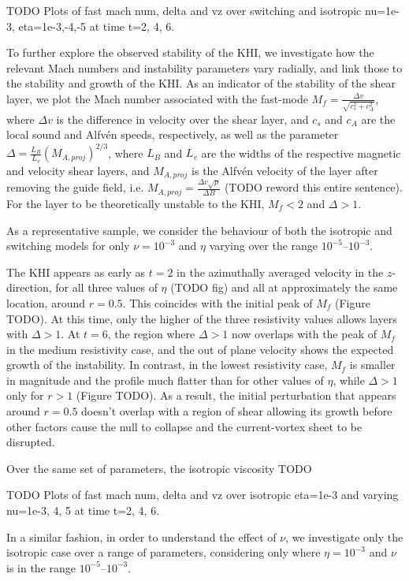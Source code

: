 TODO Plots of fast mach num, delta and vz over switching and isotropic nu=1e-3, eta=1e-3,-4,-5 at time t=2, 4, 6.

To further explore the observed stability of the KHI, we investigate how the relevant Mach numbers and instability parameters vary radially, and link those to the stability and growth of the KHI. As an indicator of the stability of the shear layer, we plot the Mach number associated with the fast-mode $M_f = \frac{\Delta v}{\sqrt{c_s^2 + c_A^2}}$, where $\Delta v$ is the difference in velocity over the shear layer, and $c_s$ and $c_A$ are the local sound and Alfv\'en speeds, respectively, as well as the parameter $\Delta = \frac{L_B}{L_v}(M_{A, proj})^{2/3}$, where $L_B$ and $L_v$ are the widths of the respective magnetic and velocity shear layers, and $M_{A, proj}$ is the Alfv\'en velocity of the layer after removing the guide field, i.e. $M_{A, proj} = \frac{\Delta v \sqrt{\rho}}{\Delta B}$ (TODO reword this entire sentence). For the layer to be theoretically unstable to the KHI, $M_f < 2$ and $\Delta > 1$.

As a representative sample, we consider the behaviour of both the isotropic and switching models for only $\nu=10^{-3}$ and $\eta$ varying over the range $10^{-5}$--$10^{-3}$.

The KHI appears as early as $t=2$ in the azimuthally averaged velocity in the $z$-direction, for all three values of $\eta$ (TODO fig) and all at approximately the same location, around $r=0.5$. This coincides with the initial peak of $M_f$ (Figure TODO). At this time, only the higher of the three resistivity values allows layers with $\Delta > 1$. At $t=6$, the region where $\Delta>1$ now overlaps with the peak of $M_f$ in the medium resistivity case, and the out of plane velocity shows the expected growth of the instability. In contrast, in the lowest resistivity case, $M_f$ is smaller in magnitude and the profile much flatter than for other values of $\eta$, while $\Delta>1$ only for $r>1$ (Figure TODO). As a result, the initial perturbation that appears around $r=0.5$ doesn't overlap with a region of shear allowing its growth before other factors cause the null to collapse and the current-vortex sheet to be disrupted. 

Over the same set of parameters, the isotropic viscosity TODO

TODO Plots of fast mach num, delta and vz over isotropic eta=1e-3 and varying nu=1e-3, 4, 5 at time t=2, 4, 6.

In a similar fashion, in order to understand the effect of $\nu$, we investigate only the isotropic case over a range of parameters, considering only where $\eta=10^{-3}$ and $\nu$ is in the range $10^{-5}$--$10^{-3}$.

